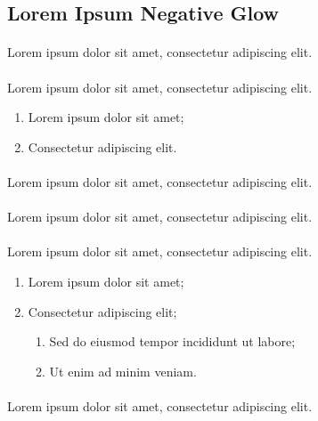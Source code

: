 \subsection*{Lorem Ipsum Negative Glow}

\paragraph{}
Lorem ipsum dolor sit amet, consectetur adipiscing elit.

\paragraph{}
Lorem ipsum dolor sit amet, consectetur adipiscing elit.

\begin{enumerate}
\item Lorem ipsum dolor sit amet;
\item Consectetur adipiscing elit.
\end{enumerate}

\paragraph{}
Lorem ipsum dolor sit amet, consectetur adipiscing elit.

\paragraph{}
Lorem ipsum dolor sit amet, consectetur adipiscing elit.

\paragraph{}
Lorem ipsum dolor sit amet, consectetur adipiscing elit.

\begin{enumerate}
\item Lorem ipsum dolor sit amet;
\item Consectetur adipiscing elit;
\begin{enumerate}
    \item Sed do eiusmod tempor incididunt ut labore;
    \item Ut enim ad minim veniam.
\end{enumerate}
\end{enumerate}

\paragraph{}
Lorem ipsum dolor sit amet, consectetur adipiscing elit.